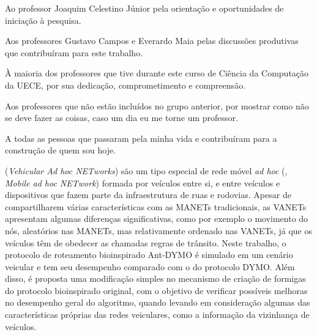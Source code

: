 \noindent
Ao professor Joaquim Celestino Júnior pela orientação e oportunidades de
iniciação à pesquisa.

\noindent
Aos professores Gustavo Campos e Everardo Maia pelas discussões
produtivas que contribuíram para este trabalho. 

\noindent
À maioria dos professores que tive durante este curso de Ciência da
Computação da UECE, por sua dedicação, comprometimento e compreensão. 

\noindent
Aos professores que não estão incluídos no grupo anterior, por mostrar
como não se deve fazer as coisas, caso um dia eu me torne um professor.

\noindent
A todas as pessoas que passaram pela minha vida e contribuíram para a
construção de quem sou hoje.

\pagebreak

\makeepigrafe


\begin{resumo}
\noindent
{} (\textit{Vehicular Ad hoc NETworks})
são um tipo especial de rede móvel \textit{ad hoc} (, \textit{Mobile ad hoc NETwork}) formada por veículos entre si, e
entre veículos e dispositivos que fazem parte da infraestrutura de ruas e
rodovias. Apesar de compartilharem várias características com as MANETs
tradicionais, as VANETs apresentam algumas diferenças significativas, como por
exemplo o movimento do nós, aleatórios nas MANETs, mas relativamente ordenado
nas VANETs, já que os veículos têm de obedecer as chamadas regras de trânsito.
Neste trabalho, o protocolo de roteamento bioinspirado Ant-DYMO é simulado em
um cenário veicular e tem seu desempenho comparado com o do protocolo DYMO.
Além disso, é proposta uma modificação simples no mecanismo de criação de
formigas do protocolo bioinspirado original, com o objetivo de verificar
possíveis melhoras no desempenho geral do algoritmo, quando levando em
consideração algumas das características próprias das redes veiculares, como a
informação da vizinhança de veículos.

\vspace{1cm}
\noindent
\palavraschave
\end{resumo}
\pagebreak

